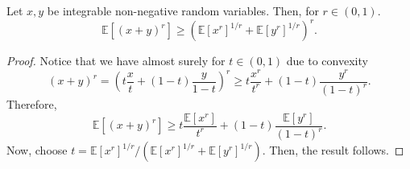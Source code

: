 \begin{lem}[]
    Let \( x,y \) be integrable non-negative random variables. Then, for \( r \in (0,1) \).
    \[ \mathbb{E}\left[\left(x+y\right)^{r}\right] \geq  \left(\mathbb{E}\left[x^{r}\right]^{1/r} + \mathbb{E}\left[y^{r}\right]^{1/r}\right)^{r}. \]
\end{lem}

\begin{proof}
    Notice that we have almost surely for \( t \in (0,1) \) due to convexity
    \[ \left(x+y\right)^{r}= \left(t \frac{x}{t} + (1-t) \frac{y}{1-t}\right)^{r} \geq t \frac{x^{r}}{t^{r}} + (1-t) \frac{y^{r}}{(1-t)^{r}}. \] 
    Therefore, 
    \[ \mathbb{E}\left[ \left(x+y\right)^{r}\right] \geq t \frac{\mathbb{E}\left[x^{r}\right]}{t^{r}} + (1-t) \frac{\mathbb{E}\left[y^{r}\right]}{(1-t)^{r}} .\]
    Now, choose \( t= \mathbb{E}\left[x^{r}\right]^{1/r}/\left(\mathbb{E}\left[x^{r}\right]^{1/r}+\mathbb{E}\left[y^{r}\right]^{1/r}\right) \). Then, the result follows.
\end{proof}

